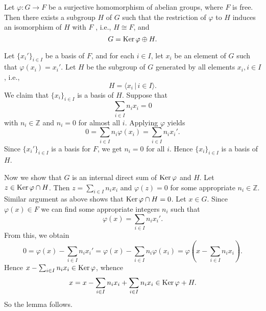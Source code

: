\begin{lemma} \label{lemma-FGAG}
	Let $\varphi:G \to F$ be a surjective homomorphism of abelian groups, where $F$ is free.  Then there exists a subgroup $H$ of $G$ such that the restriction of $\varphi$ to $H$ induces an isomorphism of $H$ with $F$ , i.e., $H\cong F$, and $$G = \operatorname{Ker} \varphi \oplus H.$$
\end{lemma}
\begin{sketch}
	Let $\{x_i'\}_{i \in I}$ be a basis of $F$, and for each $i \in I$, let $x_i$ be an element of $G$ such that $\varphi(x_i) = x_i'$. Let $H$ be the subgroup of $G$ generated by all elements $x_i, i \in I$, i.e., \begin{equation*}
		H = \langle x_i \,|\, i\in I \rangle.
	\end{equation*} We claim that $\{x_i\}_{i\in I}$ is a basis of $H$. Suppose that
	\begin{equation*}
		\sum_{i \in I} n_i x_i = 0
	\end{equation*}
	with $n_i\in\mathbb{Z}$ and $n_i = 0$ for almost all $i$. Applying $\varphi$ yields
	\begin{equation*}
		0 = \sum_{i \in I} n_i \varphi(x_i) = \sum_{i \in I} n_i x_i'.
	\end{equation*}
	Since $\{x_i'\}_{i \in I}$ is a basis for $F$, we get $n_i = 0$ for all $i$. Hence  $\{x_i\}_{i \in I}$ is a basis of $H$. 
	
	Now we show that $G$ is an internal direct sum of $\operatorname{Ker} \varphi$ and $H$. Let $z \in \operatorname{Ker} \varphi \cap H$. Then $z = \sum_{i\in I}n_ix_i$ and $\varphi(z) = 0$ for some appropriate $n_i\in \mathbb{Z}$. Similar argument as above shows that $\operatorname{Ker} \varphi \cap H = 0$. Let $x \in G$. Since $\varphi(x) \in F$ we can find some appropriate integers $n_i$ such that
	\begin{equation*}
		\varphi(x) = \sum_{i \in I} n_i x_i'.
	\end{equation*}
	From this, we obtain
	\begin{equation*}
		0=\varphi(x) -  \sum_{i \in I} n_i x_i' = \varphi(x) -  \sum_{i \in I} n_i \varphi(x_i) = \varphi\left(x - \sum_{i \in I} n_i x_i\right).
	\end{equation*}
	Hence $x - \sum_{i \in I} n_i x_i \in \operatorname{Ker}\varphi$, whence
	\begin{equation*}
		x = x -  \sum_{i \in I} n_i x_i +  \sum_{i \in I} n_i x_i \in \operatorname{Ker} \varphi + H.
	\end{equation*}  So the lemma follows.
\end{sketch}

